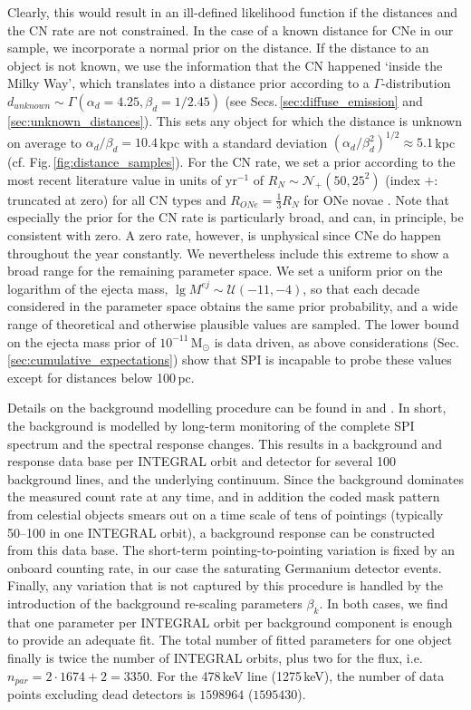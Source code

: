 \documentclass{aa}
\newcommand{\mrm}[1]{\mathrm{#1}}
\begin{document}
Clearly, this would result in an ill-defined likelihood function if the distances and the CN rate are not constrained.
%
In the case of a known distance for CNe in our sample, we incorporate a normal prior on the distance.
%
If the distance to an object is not known, we use the information that the CN happened `inside the Milky Way', which translates into a distance prior according to a $\Gamma$-distribution  $d_{unknown} \sim \Gamma(\alpha_d=4.25,\beta_d=1/2.45)$ (see Secs.\,\ref{sec:diffuse_emission} and \ref{sec:unknown_distances}).
%
This sets any object for which the distance is unknown on average to $\alpha_d/\beta_d = 10.4$\,kpc with a standard deviation $(\alpha_d/\beta_d^2)^{1/2} \approx 5.1$\,kpc (cf. Fig.\,\ref{fig:distance_samples}).
%
For the CN rate, we set a prior according to the most recent literature value in units of $\mrm{yr^{-1}}$ of $R_N \sim \mathscr{N}_+(50,25^2)$ (index $+$: truncated at zero) for all CN types and $R_{ONe} = \frac{1}{3} R_N$ for ONe novae \citep[][]{Shafter2017_novarate}.
%
Note that especially the prior for the CN rate is particularly broad, and can, in principle, be consistent with zero.
%
A zero rate, however, is unphysical since CNe do happen throughout the year constantly.
%
We nevertheless include this extreme to show a broad range for the remaining parameter space.
%
We set a uniform prior on the logarithm of the ejecta mass, $\lg M^{ej} \sim \mathscr{U}(-11,-4)$, so that each decade considered in the parameter space obtains the same prior probability, and a wide range of theoretical and otherwise plausible values are sampled.
%
The lower bound on the ejecta mass prior of $10^{-11}\,\mathrm{M_{\odot}}$ is data driven, as above considerations (Sec.\,\ref{sec:cumulative_expectations}) show that SPI is incapable to probe these values except for distances below 100\,pc.

Details on the background modelling procedure can be found in \citet{Diehl2018_BGRDB} and \citet{Siegert2019_SPIBG}.
%
In short, the background is modelled by long-term monitoring of the complete SPI spectrum and the spectral response changes.
%
This results in a background and response data base per INTEGRAL orbit and detector for several 100 background lines, and the underlying continuum.
%
Since the background dominates the measured count rate at any time, and in addition the coded mask pattern from celestial objects smears out on a time scale of tens of pointings (typically 50--100 in one INTEGRAL orbit), a background response can be constructed from this data base.
%
The short-term pointing-to-pointing variation is fixed by an onboard counting rate, in our case the saturating Germanium detector events.
%
Finally, any variation that is not captured by this procedure is handled by the introduction of the background re-scaling parameters $\beta_k$.
%
In both cases, we find that one parameter per INTEGRAL orbit per background component is enough to provide an adequate fit.
%
The total number of fitted parameters for one object finally is twice the number of INTEGRAL orbits, plus two for the flux, i.e. $n_{par} = 2 \cdot 1674 + 2 = 3350$.
%
For the 478\,keV line (1275\,keV), the number of data points excluding dead detectors is $1598964$ ($1595430$).
\end{document}

